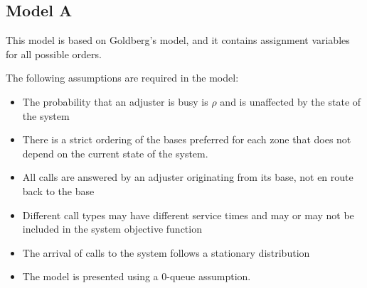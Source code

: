 
\subsection{Model A}

\begin{frame}
  This model is based on Goldberg's model, and it contains assignment
  variables for all possible orders.

  The following assumptions are required in the model:
  \begin{itemize}
  \item The probability that an adjuster is busy is $\rho$
    and is unaffected by the state of the system
  \item There is a strict ordering of the bases preferred for each zone
    that does not depend on the current state of the system. 
  \item All calls are answered by an adjuster originating from its base,
    not en route back to the base
  \item Different call types may have different service times
    and may or may not be included in the system objective function
  \item The arrival of calls to the system follows a stationary distribution
  \item The model is presented using a 0-queue assumption.
  \end{itemize}
  
\end{frame}


